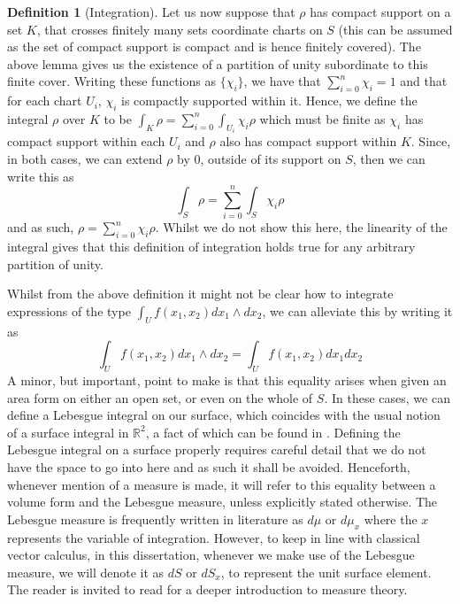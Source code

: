 \documentclass[11pt]{report}
\theoremstyle{definition}
\newtheorem{defn}[thm]{Definition}
\begin{document}
\begin{defn}[Integration]
  Let us now suppose that $\rho$ has compact support on a set $K$, that crosses finitely many sets coordinate charts on $S$ (this can be assumed as the set of compact support is compact and is hence finitely covered). The above lemma gives us the existence of a partition of unity subordinate to this finite cover. Writing these functions as $\{\chi_i\}$, we have that $\sum\limits_{i = 0}^n \chi_i = 1$ and that for each chart $U_i$, $\chi_i$ is compactly supported within it. Hence, we define the integral $\rho$ over $K$ to be $\int_K \rho = \sum\limits_{i=0}^n\int_{U_i}\chi_i\rho$ which must be finite as $\chi_i$ has compact support within each $U_i$ and $\rho$ also has compact support within $K$. Since, in both cases, we can extend $\rho$ by 0, outside of its support on $S$, then we can write this as 
  \[\int_S \rho = \sum\limits_{i=0}^n\int_S\chi_i\rho\]
  and as such, $\rho = \sum\limits_{i=0}^n\chi_i\rho$. Whilst we do not show this here, the linearity of the integral gives that this definition of integration holds true for any arbitrary partition of unity.
\end{defn}

Whilst from the above definition it might not be clear how to integrate expressions of the type $\int_U f(x_1,x_2)dx_1\wedge dx_2$, we can alleviate this by writing it as 
\[\int_U f(x_1,x_2)dx_1\wedge dx_2 = \int_U f(x_1,x_2)dx_1dx_2\]
A minor, but important, point to make is that this equality arises when given an area form on either an open set, or even on the whole of $S$. In these cases, we can define a Lebesgue integral on our surface, which coincides with the usual notion of a surface integral in $\mathbb{R}^2$, a fact of which can be found in \cite[Chapter 4]{spivak}. Defining the Lebesgue integral on a surface properly requires careful detail that we do not have the space to go into here and as such it shall be avoided. Henceforth, whenever mention of a measure is made, it will refer to this equality between a volume form and the Lebesgue measure, unless explicitly stated otherwise. The Lebesgue measure is frequently written in literature as $d\mu$ or $d\mu_x$ where the $x$ represents the variable of integration. However, to keep in line with classical vector calculus, in this dissertation, whenever we make use of the Lebesgue measure, we will denote it as $dS$ or $dS_x$, to represent the unit surface element. The reader is invited to read \cite[Chapter 11]{babyRudin} for a deeper introduction to measure theory.
\end{document}
